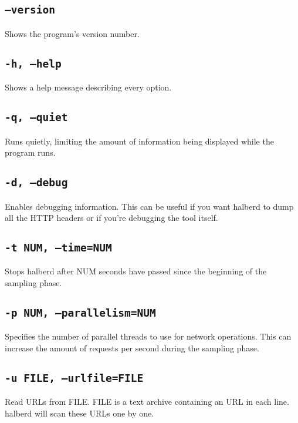 \documentclass[a4paper]{book}
\begin{document}
\subsection{\texttt{--version}}

Shows the program's version number.

\subsection{\texttt{-h, --help}}

Shows a help message describing every option.

\subsection{\texttt{-q, --quiet}}

Runs quietly, limiting the amount of information being displayed while the
program runs.

\subsection{\texttt{-d, --debug}}

Enables debugging information.  This can be useful if you want halberd to dump
all the HTTP headers or if you're debugging the tool itself.

\subsection{\texttt{-t NUM, --time=NUM}}

\label{sec:time}
Stops halberd after NUM seconds have passed since the beginning of the
sampling phase.

\subsection{\texttt{-p NUM, --parallelism=NUM}}

\label{sec:parallelism}
Specifies the number of parallel threads to use for network operations.  This
can increase the amount of requests per second during the sampling phase.

\subsection{\texttt{-u FILE, --urlfile=FILE}}

\label{sec:urlfile}
Read URLs from FILE.  FILE is a text archive containing an URL in each line.
halberd will scan these URLs one by one.
\end{document}
